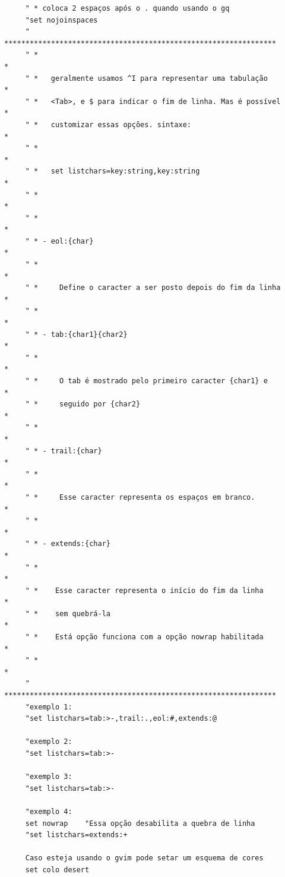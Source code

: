 \documentclass[10pt,a4paper,openany]{book}
\begin{document}
\begin{verbatim}
     " * coloca 2 espaços após o . quando usando o gq
     "set nojoinspaces
     " ****************************************************************
     " *                                                              *
     " *   geralmente usamos ^I para representar uma tabulação        *
     " *   <Tab>, e $ para indicar o fim de linha. Mas é possível     *
     " *   customizar essas opções. sintaxe:                          *
     " *                                                              *
     " *   set listchars=key:string,key:string                        *
     " *                                                              *
     " *                                                              *
     " * - eol:{char}                                                 *
     " *                                                              *
     " *     Define o caracter a ser posto depois do fim da linha     *
     " *                                                              *
     " * - tab:{char1}{char2}                                         *
     " *                                                              *
     " *     O tab é mostrado pelo primeiro caracter {char1} e        *
     " *     seguido por {char2}                                      *
     " *                                                              *
     " * - trail:{char}                                               *
     " *                                                              *
     " *     Esse caracter representa os espaços em branco.           *
     " *                                                              *
     " * - extends:{char}                                             *
     " *                                                              *
     " *    Esse caracter representa o início do fim da linha         *
     " *    sem quebrá-la                                             *
     " *    Está opção funciona com a opção nowrap habilitada         * 
     " *                                                              *
     " ****************************************************************
     "exemplo 1:
     "set listchars=tab:>-,trail:.,eol:#,extends:@
     
     "exemplo 2:
     "set listchars=tab:>-
     
     "exemplo 3:
     "set listchars=tab:>-
     
     "exemplo 4:
     set nowrap    "Essa opção desabilita a quebra de linha
     "set listchars=extends:+
     
     Caso esteja usando o gvim pode setar um esquema de cores
     set colo desert
\end{verbatim}
\end{document}
